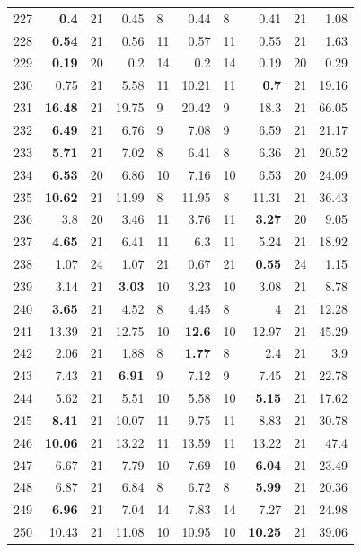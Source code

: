 \begin{longtable}{lr@{\hskip 4pt}l@{\hskip 12pt}r@{\hskip 4pt}l@{\hskip 12pt}r@{\hskip 4pt}l@{\hskip 12pt}r@{\hskip 4pt}l@{\hskip 12pt}r}
227 & \textbf{0.4} & 21 & 0.45 & 8 & 0.44 & 8 & 0.41 & 21 & 1.08 \\
228 & \textbf{0.54} & 21 & 0.56 & 11 & 0.57 & 11 & 0.55 & 21 & 1.63 \\
229 & \textbf{0.19} & 20 & 0.2 & 14 & 0.2 & 14 & 0.19 & 20 & 0.29 \\
230 & 0.75 & 21 & 5.58 & 11 & 10.21 & 11 & \textbf{0.7} & 21 & 19.16 \\
231 & \textbf{16.48} & 21 & 19.75 & 9 & 20.42 & 9 & 18.3 & 21 & 66.05 \\
232 & \textbf{6.49} & 21 & 6.76 & 9 & 7.08 & 9 & 6.59 & 21 & 21.17 \\
233 & \textbf{5.71} & 21 & 7.02 & 8 & 6.41 & 8 & 6.36 & 21 & 20.52 \\
234 & \textbf{6.53} & 20 & 6.86 & 10 & 7.16 & 10 & 6.53 & 20 & 24.09 \\
235 & \textbf{10.62} & 21 & 11.99 & 8 & 11.95 & 8 & 11.31 & 21 & 36.43 \\
236 & 3.8 & 20 & 3.46 & 11 & 3.76 & 11 & \textbf{3.27} & 20 & 9.05 \\
237 & \textbf{4.65} & 21 & 6.41 & 11 & 6.3 & 11 & 5.24 & 21 & 18.92 \\
238 & 1.07 & 24 & 1.07 & 21 & 0.67 & 21 & \textbf{0.55} & 24 & 1.15 \\
239 & 3.14 & 21 & \textbf{3.03} & 10 & 3.23 & 10 & 3.08 & 21 & 8.78 \\
240 & \textbf{3.65} & 21 & 4.52 & 8 & 4.45 & 8 & 4 & 21 & 12.28 \\
241 & 13.39 & 21 & 12.75 & 10 & \textbf{12.6} & 10 & 12.97 & 21 & 45.29 \\
242 & 2.06 & 21 & 1.88 & 8 & \textbf{1.77} & 8 & 2.4 & 21 & 3.9 \\
243 & 7.43 & 21 & \textbf{6.91} & 9 & 7.12 & 9 & 7.45 & 21 & 22.78 \\
244 & 5.62 & 21 & 5.51 & 10 & 5.58 & 10 & \textbf{5.15} & 21 & 17.62 \\
245 & \textbf{8.41} & 21 & 10.07 & 11 & 9.75 & 11 & 8.83 & 21 & 30.78 \\
246 & \textbf{10.06} & 21 & 13.22 & 11 & 13.59 & 11 & 13.22 & 21 & 47.4 \\
247 & 6.67 & 21 & 7.79 & 10 & 7.69 & 10 & \textbf{6.04} & 21 & 23.49 \\
248 & 6.87 & 21 & 6.84 & 8 & 6.72 & 8 & \textbf{5.99} & 21 & 20.36 \\
249 & \textbf{6.96} & 21 & 7.04 & 14 & 7.83 & 14 & 7.27 & 21 & 24.98 \\
250 & 10.43 & 21 & 11.08 & 10 & 10.95 & 10 & \textbf{10.25} & 21 & 39.06 \\

\end{longtable}
